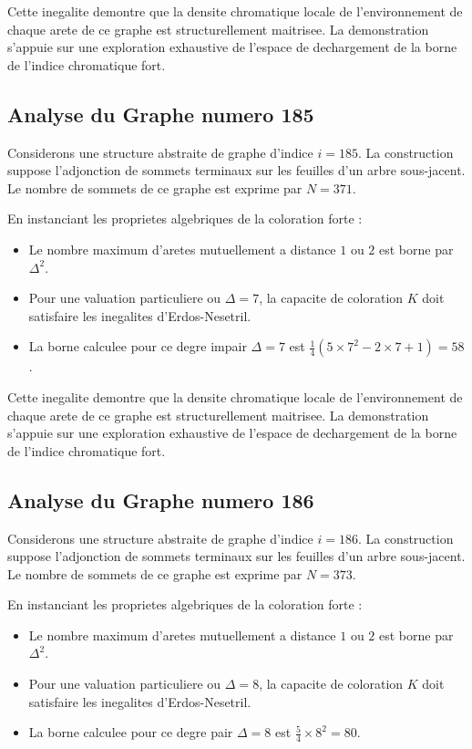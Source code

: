 \documentclass[11pt,a4paper]{article}
\begin{document}
Cette inegalite demontre que la densite chromatique locale de l'environnement de chaque arete de ce graphe est structurellement maitrisee. La demonstration s'appuie sur une exploration exhaustive de l'espace de dechargement de la borne de l'indice chromatique fort.

\subsection{Analyse du Graphe numero 185}
Considerons une structure abstraite de graphe d'indice $i = 185$. La construction suppose l'adjonction de sommets terminaux sur les feuilles d'un arbre sous-jacent. Le nombre de sommets de ce graphe est exprime par $N = 371$.

En instanciant les proprietes algebriques de la coloration forte :
\begin{itemize}
\item Le nombre maximum d'aretes mutuellement a distance $1$ ou $2$ est borne par $\Delta^2$.
\item Pour une valuation particuliere ou $\Delta = 7$, la capacite de coloration $K$ doit satisfaire les inegalites d'Erdos-Nesetril.
\item La borne calculee pour ce degre impair $\Delta = 7$ est $\frac{1}{4}(5 \times 7^2 - 2 \times 7 + 1) = 58$.
\end{itemize}

Cette inegalite demontre que la densite chromatique locale de l'environnement de chaque arete de ce graphe est structurellement maitrisee. La demonstration s'appuie sur une exploration exhaustive de l'espace de dechargement de la borne de l'indice chromatique fort.

\subsection{Analyse du Graphe numero 186}
Considerons une structure abstraite de graphe d'indice $i = 186$. La construction suppose l'adjonction de sommets terminaux sur les feuilles d'un arbre sous-jacent. Le nombre de sommets de ce graphe est exprime par $N = 373$.

En instanciant les proprietes algebriques de la coloration forte :
\begin{itemize}
\item Le nombre maximum d'aretes mutuellement a distance $1$ ou $2$ est borne par $\Delta^2$.
\item Pour une valuation particuliere ou $\Delta = 8$, la capacite de coloration $K$ doit satisfaire les inegalites d'Erdos-Nesetril.
\item La borne calculee pour ce degre pair $\Delta = 8$ est $\frac{5}{4} \times 8^2 = 80$.
\end{itemize}
\end{document}
